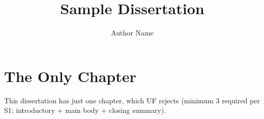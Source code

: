 \documentclass{ufdissertation}
\title{Sample Dissertation}
\author{Author Name}
\begin{document}
\chapter{The Only Chapter}
This dissertation has just one chapter, which UF rejects (minimum 3
required per S1: introductory + main body + closing summary).
\end{document}
